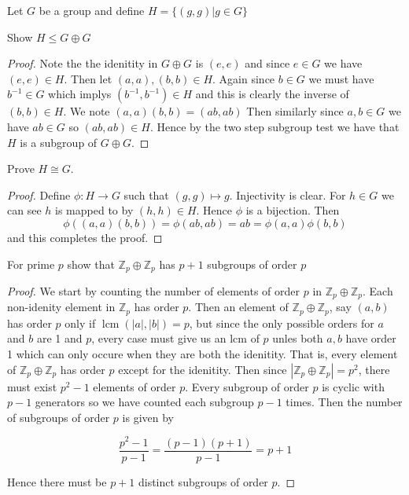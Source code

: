 \documentclass[11pt,largemargins]{homework}
\newcommand{\Z}{\mathbb{Z}}
\newcommand{\lcm}{\operatorname{lcm}}
\begin{document}
\maketitle

\question
Let $G$ be a group and define $H = \{ (g,g) | g \in G \}$
\begin{alphaparts}
    \questionpart
    Show $H \leq G \oplus G$

    \begin{proof}
        Note the the idenitity in $G \oplus G$ is $(e,e)$ and since $e \in G$ we have $(e, e) \in H$. Then 
        let $(a, a), (b, b) \in H$. Again since $b \in G$ we must have $b^{-1} \in G$ which implys $(b^{-1}, b^{-1}) \in H$ and this is 
        clearly the inverse of $(b, b) \in H$. We note $(a,a) (b, b) = (ab, ab)$
        Then similarly since $a, b \in G$ we have $ab \in G$ so $(ab, ab) \in H$. 
        Hence by the two step subgroup test we have that $H$ is a subgroup of $G \oplus G$. 
    \end{proof}

    \questionpart
    Prove $H \cong G$. 

    \begin{proof}
        Define $\phi :H \to G$ such that $(g,g) \mapsto g$. Injectivity is clear. For $h \in G$ we can see 
        $h$ is mapped to by $(h, h) \in H$. Hence $\phi $ is a bijection. Then 
        \[\phi((a,a)(b,b)) = \phi(ab,ab) = ab = \phi(a,a) \phi(b,b)\]
        and this completes the proof.
    \end{proof}
\end{alphaparts}

\question
For prime $p$ show that $\Z_p \oplus \Z_p$ has $p + 1$ subgroups of order $p$

\begin{proof}
    We start by counting the number of elements of order $p$ in $\Z_p \oplus \Z_p$. Each non-idenity element in $\Z_p$ has 
    order $p$. Then an element of $\Z_p \oplus \Z_p$, say $(a, b)$ has order $p$ only if $\lcm(|a|,|b|) = p$, but since the only possible 
    orders for $a$ and $b$ are 1 and $p$, every case must give us an lcm of $p$ unles both $a,b$ have order 1 which can only occure when 
    they are both the idenitity. That is, every element of $\Z_p \oplus \Z_p$ has order $p$ except for the idenitity. Then since 
    $|\Z_p \oplus \Z_p| = p^2$, there must exist $p^2 - 1$ elements of order $p$. Every subgroup of order $p$ is cyclic with $p - 1$ generators 
    so we have counted each subgroup $p- 1$ times. Then the number of subgroups of order $p$ is given by 

    \[\frac{p^2 - 1}{p - 1} = \frac{(p - 1)(p + 1)}{p - 1} = p + 1\]

    Hence there must be $p + 1 $ distinct subgroups of order $p$. 
\end{proof}
\end{document}
